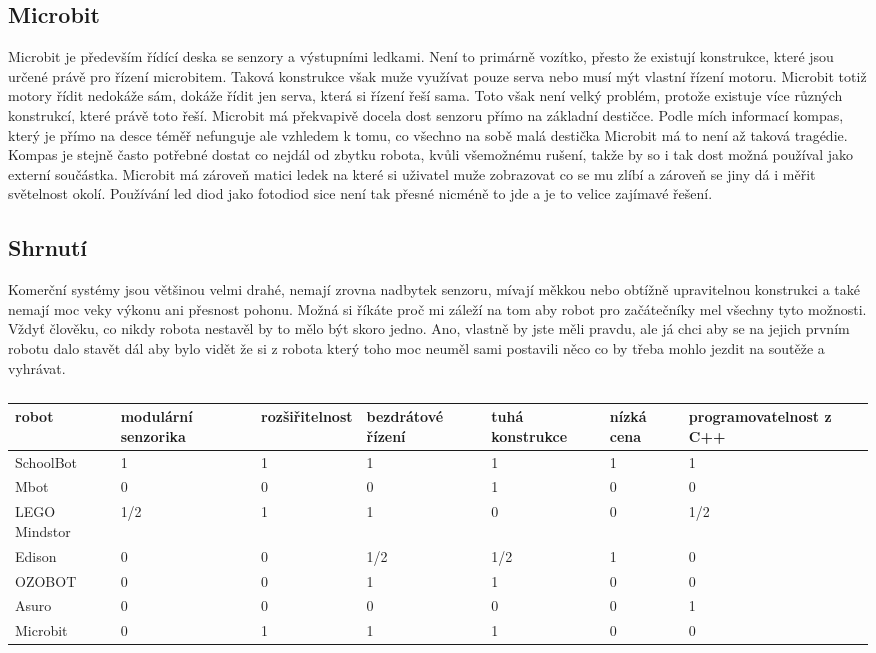 \documentclass{template/socthesis}
\begin{document}
\subsection{Microbit}
Microbit je především řídící deska se senzory a výstupními ledkami. Není to primárně vozítko, přesto že existují konstrukce, které jsou určené právě pro řízení microbitem. Taková konstrukce však muže využívat pouze serva nebo musí mýt vlastní řízení motoru. Microbit totiž motory řídit nedokáže sám, dokáže řídit jen serva, která si řízení řeší sama. Toto však není velký problém, protože existuje více různých konstrukcí, které právě toto řeší. Microbit má překvapivě docela dost senzoru přímo na základní destičce. Podle mích informací kompas, který je přímo na desce téměř nefunguje ale vzhledem k tomu, co všechno na sobě malá destička Microbit má to není až taková tragédie. Kompas je stejně často potřebné dostat co nejdál od zbytku robota, kvůli všemožnému rušení, takže by so i tak dost možná používal jako externí součástka.
Microbit má zároveň matici ledek na které si uživatel muže zobrazovat co se mu zlíbí a zároveň se jiny dá i měřit světelnost okolí. Používání led diod jako fotodiod sice není tak přesné nicméně to jde a je to velice zajímavé řešení.

\subsection{Shrnutí}
Komerční systémy jsou většinou velmi drahé, nemají zrovna nadbytek senzoru, mívají měkkou nebo obtížně upravitelnou konstrukci a také nemají moc veky výkonu ani přesnost pohonu.
Možná si říkáte proč mi záleží na tom aby robot pro začátečníky mel všechny tyto možnosti. Vždyť člověku, co nikdy robota nestavěl by to mělo být skoro jedno. Ano, vlastně by jste měli pravdu, ale já chci aby se na jejich prvním robotu dalo stavět dál aby bylo vidět že si z robota který toho moc neuměl sami postavili něco co by třeba mohlo jezdit na soutěže a vyhrávat.

\begin{table}[h]
	\centering
	\begin{tabular}{|l|l|l|l|l|l|l|}
		\hline
		robot 			& modulární senzorika & rozšiřitelnost & bezdrátové řízení & tuhá konstrukce & nízká cena & programovatelnost z C++\\ \hline
		SchoolBot 		& 1 				& 1 			& 1 			& 1 			& 1 		& 1	\\ 
		Mbot 			& 0 				& 0 			& 0 			& 1 			& 0			& 0	\\ 
		LEGO Mindstor 	& 1/2 				& 1 			& 1 			& 0 			& 0			& 1/2	\\ 
		Edison 			& 0 				& 0 			& 1/2 			& 1/2 			& 1			& 0	\\ 
		OZOBOT			& 0					& 0				& 1 			& 1				& 0			& 0	\\
		Asuro			& 0					& 0				& 0 			& 0				& 0			& 1	\\
		Microbit		& 0					& 1				& 1 			& 1				& 0			& 0	\\
		\hline
	\end{tabular}
	\caption{}
\end{table}
\end{document}

